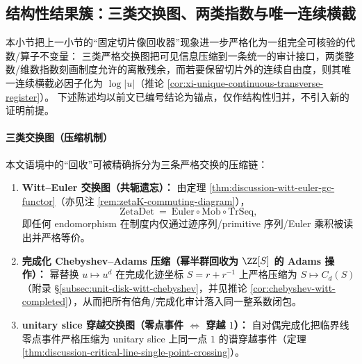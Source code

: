 \subsection{结构性结果簇：三类交换图、两类指数与唯一连续横截}\label{subsec:discussion-gc-three-diagrams-two-indices-unique-transversal}
本小节把上一小节的“固定切片像回收器”现象进一步严格化为一组完全可核验的代数/算子不变量：
三类严格交换图把可见信息压缩到一条统一的审计接口，两类整数/维数指数刻画制度允许的离散残余，而若要保留切片外的连续自由度，则其唯一连续横截必因子化为 \(\log|u|\)（推论 \ref{cor:xi-unique-continuous-transverse-register}）。
下述陈述均以前文已编号结论为锚点，仅作结构性归并，不引入新的证明前提。

\paragraph{三类交换图（压缩机制）}
本文语境中的“回收”可被精确拆分为三条严格交换的压缩链：
\begin{enumerate}
  \item \textbf{Witt--Euler 交换图（共轭遗忘）：}
  由定理 \ref{thm:discussion-witt-euler-gc-functor}（亦见注 \ref{rem:zetaK-commuting-diagram}），
  \[
  \mathrm{ZetaDet}
  ~=~
  \mathrm{Euler}\circ\mathrm{Mob}\circ\mathrm{TrSeq},
  \]
  即任何 endomorphism 在制度内仅通过迹序列/primitive 序列/Euler 乘积被读出并严格等价。
  \item \textbf{完成化 Chebyshev--Adams 压缩（幂半群回收为 \(\ZZ[S]\) 的 Adams 操作）：}
  幂替换 \(u\mapsto u^d\) 在完成化迹坐标 \(S=r+r^{-1}\) 上严格压缩为 \(S\mapsto C_d(S)\)（附录 \S\ref{subsec:unit-disk-witt-chebyshev}，并见推论 \ref{cor:chebyshev-witt-completed}），从而把所有倍角/完成化审计落入同一整系数闭包。
  \item \textbf{unitary slice 穿越交换图（零点事件 \(\Leftrightarrow\) 穿越 \(1\)）：}
  自对偶完成化把临界线零点事件严格压缩为 unitary slice 上同一点 \(1\) 的谱穿越事件（定理 \ref{thm:discussion-critical-line-single-point-crossing}）。
\end{enumerate}

